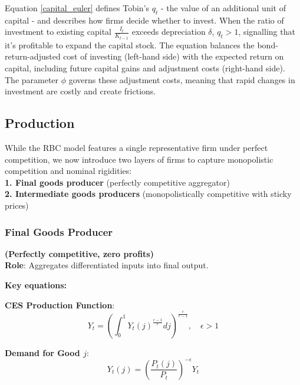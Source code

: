\documentclass[11pt,preprint]{elsarticle}
\numberwithin{equation}{section}
\numberwithin{figure}{section}
\numberwithin{table}{section}
\begin{document}
Equation \ref{capital_euler} defines Tobin's \(q_t\) - the value of an
additional unit of capital - and describes how firms decide whether to
invest. When the ratio of investment to existing capital
\(\frac{I_t}{K_{t-1}}\) exceeds depreciation \(\delta\), \(q_t > 1\),
signalling that it's profitable to expand the capital stock. The
equation balances the bond-return-adjusted cost of investing (left-hand
side) with the expected return on capital, including future capital
gains and adjustment costs (right-hand side). The parameter \(\phi\)
governs these adjustment costs, meaning that rapid changes in investment
are costly and create frictions.

\subsection{Production}\label{production}

While the RBC model features a single representative firm under perfect
competition, we now introduce two layers of firms to capture
monopolistic competition and nominal rigidities:\\
\textbf{1. Final goods producer} (perfectly competitive aggregator)\\
\textbf{2. Intermediate goods producers} (monopolistically competitive
with sticky prices)

\subsubsection{Final Goods Producer}\label{final-goods-producer}

\textbf{(Perfectly competitive, zero profits)}\\
\textbf{Role}: Aggregates differentiated inputs into final output.

\textbf{Key equations:}

\textbf{CES Production Function}:\\
\begin{equation}  
Y_t = \left( \int_0^1 Y_t(j)^{\frac{\epsilon-1}{\epsilon}}  dj \right)^{\frac{\epsilon}{\epsilon-1}}, \quad \epsilon > 1  
\label{ces_production}  
\end{equation}

\textbf{Demand for Good \(j\)}:\\
\begin{equation}  
Y_t(j) = \left( \frac{P_t(j)}{P_t} \right)^{-\epsilon} Y_t  
\label{demand_curve_final}  
\end{equation}
\end{document}
